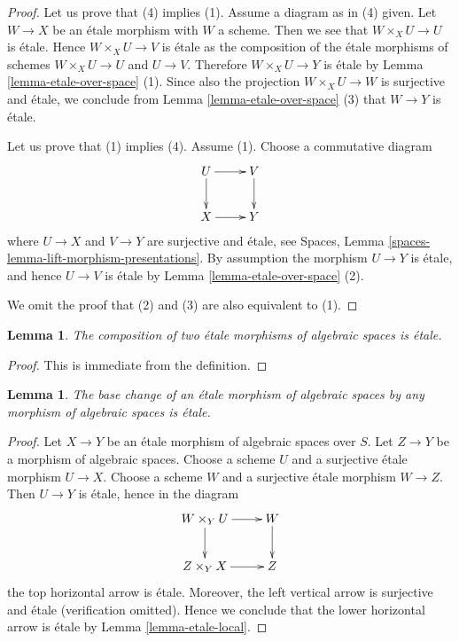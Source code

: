 \documentclass{stacks-project}
\theoremstyle{plain}
\newtheorem{lemma}[subsection]{Lemma}
\theoremstyle{definition}
\theoremstyle{remark}
\numberwithin{equation}{subsection}
\begin{document}
\begin{proof}
Let us prove that (4) implies (1). Assume a diagram as in (4) given.
Let $W \to X$ be an \'etale morphism with $W$ a scheme. Then we see
that $W \times_X U \to U$ is \'etale. Hence $W \times_X U \to V$ is \'etale
as the composition of the \'etale morphisms of schemes $W \times_X U \to U$
and $U \to V$. Therefore $W \times_X U \to Y$ is \'etale by
Lemma \ref{lemma-etale-over-space} (1). Since also
the projection $W \times_X U \to W$ is surjective and \'etale, we conclude
from Lemma \ref{lemma-etale-over-space} (3) that $W \to Y$ is \'etale.

\medskip\noindent
Let us prove that (1) implies (4). Assume (1). Choose a commutative diagram
$$
\xymatrix{
U \ar[d] \ar[r] & V \ar[d] \\
X \ar[r] & Y
}
$$
where $U \to X$ and $V \to Y$ are surjective and \'etale, see
Spaces, Lemma \ref{spaces-lemma-lift-morphism-presentations}.
By assumption the morphism $U \to Y$ is \'etale,
and hence $U \to V$ is \'etale by Lemma \ref{lemma-etale-over-space} (2).

\medskip\noindent
We omit the proof that (2) and (3) are also equivalent to (1).
\end{proof}

\begin{lemma}
\label{lemma-composition-etale}
The composition of two \'etale morphisms of algebraic spaces
is \'etale.
\end{lemma}

\begin{proof}
This is immediate from the definition.
\end{proof}

\begin{lemma}
\label{lemma-base-change-etale}
The base change of an \'etale morphism of algebraic spaces
by any morphism of algebraic spaces is \'etale.
\end{lemma}

\begin{proof}
Let $X \to Y$ be an \'etale morphism of algebraic spaces over $S$.
Let $Z \to Y$ be a morphism of algebraic spaces.
Choose a scheme $U$ and a surjective \'etale morphism $U \to X$.
Choose a scheme $W$ and a surjective \'etale morphism $W \to Z$.
Then $U \to Y$ is \'etale, hence in the diagram
$$
\xymatrix{
W \times_Y U \ar[d] \ar[r] & W \ar[d] \\
Z \times_Y X \ar[r] & Z
}
$$
the top horizontal arrow is \'etale.
Moreover, the left vertical arrow is surjective
and \'etale (verification omitted). Hence we conclude that the lower
horizontal arrow is \'etale by Lemma \ref{lemma-etale-local}.
\end{proof}
\end{document}
